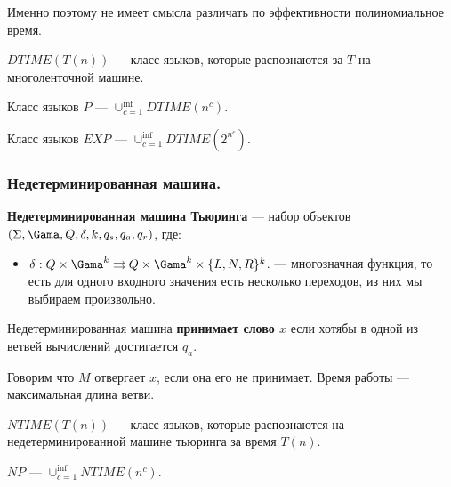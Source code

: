 \begin{Rem}
    Именно поэтому не имеет смысла различать по эффективности полиномиальное время. 
\end{Rem}

\begin{Def}
    $DTIME(T(n))$ ---  класс языков, которые распознаются за $T$ на многоленточной машине.
\end{Def}

\begin{Def}
    Класс языков $P$ ---  $\cup_{c = 1}^{\inf} DTIME(n^c)$.
\end{Def}

\begin{Def}
    Класс языков $EXP$ ---  $\cup_{c = 1}^{\inf} DTIME(2^{n^c})$.
\end{Def}

\subsubsection{Недетерминированная машина.}
\begin{Def}
    \textbf{Недетерминированная машина Тьюринга} --- набор объектов $(\Sigma, \Gama, Q, \delta, k, q_s, q_a, q_r)$, где:
    \begin{itemize}
        \item $\delta: Q \times \Gama ^ k \rightrightarrows Q \times \Gama ^k \times \{L, N, R\} ^ k$. --- многозначная функция, 
            то есть для одного входного значения есть несколько переходов, из них мы выбираем произвольно. 
    \end{itemize}
\end{Def}

\begin{Def}
   Недетерминированная машина \textbf{принимает слово $x$} если хотябы в одной из ветвей вычислений достигается $q_a$. 
\end{Def}
\begin{Def}
   Говорим что $M$ отвергает  $x$, если она его не принимает. 
   Время работы --- максимальная длина ветви.
\end{Def}

\begin{Def}
    $NTIME(T(n))$ --- класс языков, которые распознаются на недетерминированной машине тьюринга за время  $T(n)$.
\end{Def}

\begin{Def}
    $NP$ --- $\cup_{c = 1}^{\inf} NTIME(n^c)$.
\end{Def}

